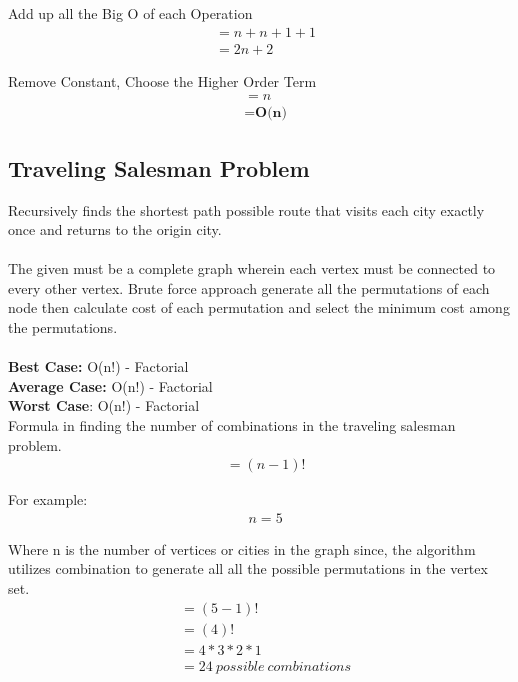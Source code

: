 \documentclass{article}
\begin{document}
Add up all the Big O of each Operation
\begin{align*}
    &\text{} = n + n + 1 + 1  \\
    &\text{} = 2n + 2
\end{align*}

Remove Constant, Choose the Higher Order Term
\begin{align*}
    &\text{} = n \\
    &\text{} = \textbf{O(n)}
\end{align*}

\subsection{Traveling Salesman Problem}
Recursively finds the shortest path possible route that visits each city exactly once and returns to the origin city. \\
\\
The given must be a complete graph wherein each vertex must be connected to every other vertex. Brute force approach generate all the permutations of each node then calculate cost of each permutation and select the minimum cost among the permutations. \\
\\
\textbf{Best Case:} O(n!) - Factorial \\
\textbf{Average Case:} O(n!) - Factorial \\
\textbf{Worst Case}: O(n!) - Factorial \\

Formula in finding the number of combinations in the traveling salesman problem.
\begin{align*}
    &\text{} = (n - 1)!
\end{align*}

For example:
\begin{align*}
    &\text{} n = 5
\end{align*}

Where n is the number of vertices or cities in the graph since, the algorithm utilizes combination to generate all all the possible permutations in the vertex set.
\begin{align*}
    &\text{} = (5 - 1)!\\
    &\text{} = (4)!\\
    &\text{} = 4 * 3 * 2 * 1\\
    &\text{} = 24 {\ possible \ combinations}\\
\end{align*}
\end{document}
